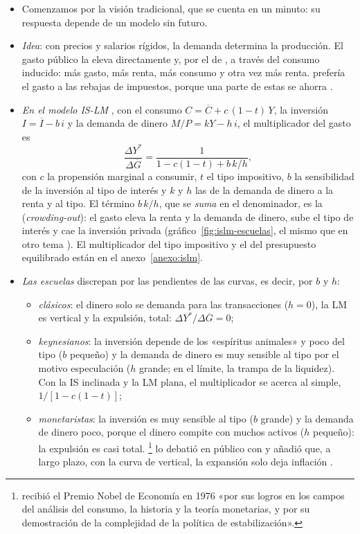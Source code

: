 \documentclass[11pt]{article}
\begin{document}
\begin{itemize}
\item Comenzamos por la visión tradicional, que se cuenta en un minuto: su respuesta depende de un modelo sin futuro.
\item \emph{Idea}: con precios y salarios rígidos, la demanda determina la producción. El gasto público la eleva directamente y, por el  de \textcite{Kahn1931Relation}, a través del consumo inducido: más gasto, más renta, más consumo y otra vez más renta.  prefería el gasto a las rebajas de impuestos, porque una parte de estas se ahorra .
\item \emph{En el modelo IS-LM} , con el consumo $C=\overline{C}+c\,(1-t)\,Y$, la inversión $I=\overline{I}-b\,i$ y la demanda de dinero $M/P=kY-h\,i$, el multiplicador del gasto es
  \begin{equation}\label{eq:multiplicador-fiscal}
  \frac{\Delta Y^*}{\Delta\overline{G}}=\frac{1}{1-c(1-t)+b\,k/h},
  \end{equation}
  con $c$ la propensión marginal a consumir, $t$ el tipo impositivo, $b$ la sensibilidad de la inversión al tipo de interés y $k$ y $h$ las de la demanda de dinero a la renta y al tipo. El término $b\,k/h$, que se \emph{suma} en el denominador, es la  (\emph{crowding-out}): el gasto eleva la renta y la demanda de dinero, sube el tipo de interés y cae la inversión privada (gráfico~\ref{fig:islm-escuelas}, el mismo que en otro tema ). El multiplicador del tipo impositivo y el del presupuesto equilibrado están en el anexo~\ref{anexo:islm}.
\item \emph{Las escuelas} discrepan por las pendientes de las curvas, es decir, por $b$ y $h$:
  \begin{itemize}
  \item \emph{clásicos}: el dinero solo se demanda para las transacciones ($h=0$), la LM es vertical y la expulsión, total: $\Delta Y^*/\Delta\overline{G}=0$;
  \item \emph{keynesianos}: la inversión depende de los «espíritus animales» y poco del tipo ($b$ pequeño) y la demanda de dinero es muy sensible al tipo por el motivo especulación ($h$ grande; en el límite, la trampa de la liquidez). Con la IS inclinada y la LM plana, el multiplicador se acerca al simple, $1/[1-c(1-t)]$;
  \item \emph{monetaristas}: la inversión es muy sensible al tipo ($b$ grande) y la demanda de dinero poco, porque el dinero compite con muchos activos ($h$ pequeño): la expulsión es casi total. \footnote{ recibió el Premio Nobel de Economía en 1976 «por sus logros en los campos del análisis del consumo, la historia y la teoría monetarias, y por su demostración de la complejidad de la política de estabilización»\nocite{Nobel1976Friedman}.} lo debatió en público con \nocite{FriedmanHeller1969Monetary} y añadió que, a largo plazo, con la curva de  vertical, la expansión solo deja inflación .

\end{itemize}
\end{itemize}
\end{document}
